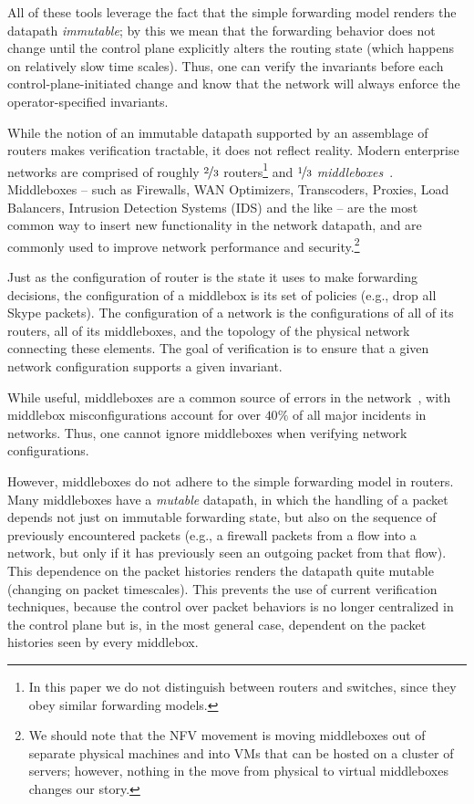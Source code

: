 All of these tools leverage the fact that the simple forwarding model renders the datapath {\em immutable}; by this we mean that the forwarding behavior does not change until the control plane explicitly alters the routing state (which happens on relatively slow time scales). Thus, one can verify the invariants before each control-plane-initiated change and know that the network will always enforce the operator-specified invariants.

While the notion of an immutable datapath supported by an assemblage of routers makes verification tractable, it does not reflect reality. Modern enterprise networks are comprised of roughly $\nicefrac{2}{3}$ routers\footnote{In this paper we do not distinguish between routers and switches, since they obey similar forwarding models.} and $\nicefrac{1}{3}$ {\em middleboxes}~\cite{sherry2012making}.  Middleboxes -- such as Firewalls, WAN Optimizers, Transcoders, Proxies, Load Balancers, Intrusion Detection Systems (IDS) and the like --  are the most common way to insert new functionality in the network datapath, and are commonly used to improve network performance and security.\footnote{We should note that the NFV movement is moving middleboxes out of separate physical machines and into VMs that can be hosted on a cluster of servers; however, nothing in the move from physical to virtual middleboxes changes our story.} 

Just as the configuration of router is the state it uses to make forwarding decisions, the configuration of a middlebox is its set of policies (e.g., drop all Skype packets). The configuration of a network is the configurations of all of its routers, all of its middleboxes, and the topology of the physical network connecting these elements. The goal of verification is to ensure that a given network configuration supports a given invariant.

While useful, middleboxes are a common source of errors in the network~\cite{potharaju2013demystifying}, with middlebox misconfigurations account for over $40\%$ of all major
incidents in networks. Thus, one cannot ignore middleboxes when verifying network configurations.

However, middleboxes do not adhere to the simple forwarding model in routers. Many middleboxes have a {\em mutable} datapath, in which the handling of a packet depends not just on immutable forwarding state, but also on the sequence of previously encountered packets (e.g., a firewall packets from a flow into a network, but only if it has previously seen an outgoing packet from that flow).  This dependence on the packet histories renders the datapath quite mutable (changing on packet timescales). This prevents the use of current verification techniques, because the control over packet behaviors is no longer centralized in the control plane but is, in the most general case, dependent on the packet histories seen by every middlebox.


